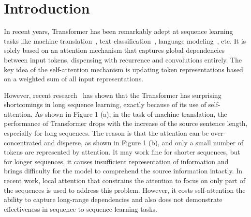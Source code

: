 \documentclass{article} %
\begin{document}
\section{Introduction}
In recent years, Transformer has been remarkably adept at sequence learning tasks like machine translation~\citep{vaswani2017attention,dehghani2018universal}, 
text classification~\citep{devlin2018bert,yang2019xlnet}, language modeling~\citep{sukhbaatar2019augmenting,Dai_2019}, etc. It is solely based on an attention mechanism that captures global dependencies between input tokens, dispensing with recurrence and convolutions entirely. The key idea of the self-attention mechanism is updating token representations based on a weighted sum of all input representations.  

However, recent research~\citep{DBLP:conf/emnlp/TangMRS18} has shown that the Transformer has surprising shortcomings in long sequence learning, exactly because of its use of self-attention. As shown in Figure 1 (a), in the task of machine translation, the performance of Transformer drops with the increase of the source sentence length, especially for long sequences. The reason is that the attention can be over-concentrated and disperse, as shown in Figure 1 (b), and only a small number of tokens are represented by attention. It may work fine for shorter sequences, but for longer sequences, it  causes insufficient representation of information and brings difficulty for the model to comprehend the source information intactly. In recent work, local attention that constrains the attention to focus on only part of the sequences \citep{child2019generating,Sukhbaatar_2019} is used to address this problem. However, it costs self-attention the ability to capture long-range dependencies and also does not demonstrate effectiveness in sequence to sequence learning tasks.
\end{document}

